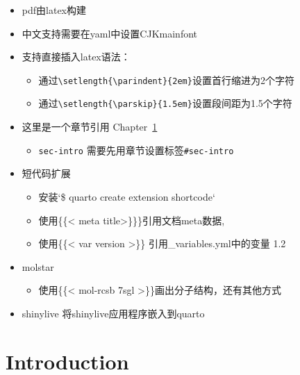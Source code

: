 \documentclass[
  letterpaper,
  DIV=11,
  numbers=noendperiod]{scrreprt}
\providecommand{\tightlist}{%
  \setlength{\itemsep}{0pt}\setlength{\parskip}{0pt}}\usepackage{longtable,booktabs,array}
\begin{document}
\begin{itemize}
\item
  pdf由latex构建
\item
  中文支持需要在yaml中设置CJKmainfont
\item
  支持直接插入latex语法：

  \begin{itemize}
  \tightlist
  \item
    通过\texttt{\textbackslash{}setlength\{\textbackslash{}parindent\}\{2em\}}设置首行缩进为2个字符
  \item
    通过\texttt{\textbackslash{}setlength\{\textbackslash{}parskip\}\{1.5em\}}设置段间距为1.5个字符
  \end{itemize}
\item
  这里是一个章节引用 Chapter~\ref{sec-intro}

  \begin{itemize}
  \tightlist
  \item
    \texttt{sec-intro} 需要先用章节设置标签\texttt{\#sec-intro}
  \end{itemize}
\item
  短代码扩展

  \begin{itemize}
  \item
    安装`\$ quarto create extension shortcode`
  \item
    使用\{\{\textless{} meta title\textgreater\}\}\}引用文档meta数据,
  \item
    使用\{\{\textless{} var version \textgreater\}\}
    引用\_variables.yml中的变量 1.2
  \end{itemize}
\item
  molstar

  \begin{itemize}
  \tightlist
  \item
    使用\{\{\textless{} mol-rcsb 7sgl
    \textgreater\}\}画出分子结构，还有其他方式
  \end{itemize}
\item
  shinylive 将shinylive应用程序嵌入到quarto
\end{itemize}

\noindent 


\hypertarget{sec-intro}{%
\chapter{Introduction}\label{sec-intro}}
\end{document}
